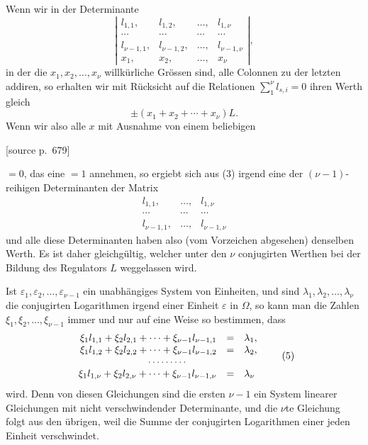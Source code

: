 \documentclass[11pt]{article}
\newcommand{\srcpage}[1]{\par\medskip\noindent\textsf{[source p.~#1]}\par\smallskip}
\begin{document}
Wenn wir in der Determinante
\begin{equation}
\left|\begin{array}{cccc}
l_{1,1},&l_{1,2},&\ldots,&l_{1,\nu}\\
\cdots&\cdots&\cdots&\cdots\\
l_{\nu-1,1},&l_{\nu-1,2},&\ldots,&l_{\nu-1,\nu}\\
x_1,&x_2,&\ldots,&x_\nu
\end{array}\right|,
\tag{4}
\end{equation}
in der die $x_1,x_2,\ldots,x_\nu$ willkürliche Grössen sind, alle Colonnen zu der letzten addiren, so erhalten wir mit Rücksicht auf die Relationen $\sum_{1}^{\nu}l_{s,i}=0$ ihren Werth gleich
\[
\pm(x_1+x_2+\cdots+x_\nu)L.
\]
Wenn wir also alle $x$ mit Ausnahme von einem beliebigen
\srcpage{679}
$=0$, das eine $=1$ annehmen, so ergiebt sich aus (3) irgend eine der $(\nu-1)$-reihigen Determinanten der Matrix
\[
\begin{array}{ccc}
l_{1,1},&\ldots,&l_{1,\nu}\\
\cdots&\cdots&\cdots\\
l_{\nu-1,1},&\ldots,&l_{\nu-1,\nu}
\end{array}
\]
und alle diese Determinanten haben also (vom Vorzeichen abgesehen) denselben Werth. Es ist daher gleichgültig, welcher unter den $\nu$ conjugirten Werthen bei der Bildung des Regulators $L$ weggelassen wird.

Ist $\varepsilon_1,\varepsilon_2,\ldots,\varepsilon_{\nu-1}$ ein unabhängiges System von Einheiten, und sind $\lambda_1,\lambda_2,\ldots,\lambda_\nu$ die conjugirten Logarithmen irgend einer Einheit $\varepsilon$ in $\Omega$, so kann man die Zahlen $\xi_1,\xi_2,\ldots,\xi_{\nu-1}$ immer und nur auf eine Weise so bestimmen, dass
\begin{equation}
\begin{array}{rcl}
\xi_1l_{1,1}+\xi_2l_{2,1}+\cdots+\xi_{\nu-1}l_{\nu-1,1}&=&\lambda_1,\\
\xi_1l_{1,2}+\xi_2l_{2,2}+\cdots+\xi_{\nu-1}l_{\nu-1,2}&=&\lambda_2,\\
\multicolumn{3}{c}{\cdots\cdots\cdots}\,\\
\xi_1l_{1,\nu}+\xi_2l_{2,\nu}+\cdots+\xi_{\nu-1}l_{\nu-1,\nu}&=&\lambda_\nu
\end{array}
\tag{5}
\end{equation}
wird. Denn von diesen Gleichungen sind die ersten $\nu-1$ ein System linearer Gleichungen mit nicht verschwindender Determinante, und die $\nu$te Gleichung folgt aus den übrigen, weil die Summe der conjugirten Logarithmen einer jeden Einheit verschwindet.
\end{document}

